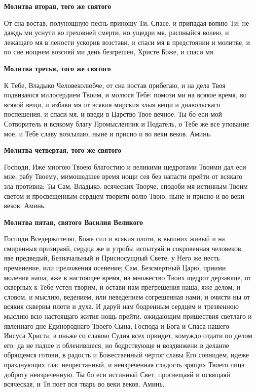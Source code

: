 \medskip
\bfseries  Молитва вторая, того же святого\normalfont{}


От сна востав, полунощную песнь приношу Ти, Спасе, и припадая вопию Ти: не даждь ми уснути во греховней смерти, но ущедри мя, распныйся волею, и лежащаго мя в лености ускорив возстави, и спаси мя в предстоянии и молитве, и по сне нощнем возсияй ми день безгрешен, Христе Боже, и спаси мя.


\medskip
\bfseries Молитва третья, того же святого\normalfont{}


К Тебе, Владыко Человеколюбче, от сна востав прибегаю, и на дела Твоя подвизаюся милосердием Твоим, и молюся Тебе: помози ми на всякое время, во всякой вещи, и избави мя от всякия мирския злыя вещи и диавольскаго поспешения, и спаси мя, и введи в Царство Твое вечное. Ты бо еси мой Сотворитель и всякому благу Промысленник и Податель, о Тебе же все упование мое, и Тебе славу возсылаю, ныне и присно и во веки веков. Аминь.


\medskip
\bfseries Молитва четвертая, того же святого\normalfont{}


Господи, Иже многою Твоею благостию и великими щедротами Твоими дал еси мне, рабу Твоему, мимошедшее время нощи сея без напасти прейти от всякаго зла противна; Ты Сам, Владыко, всяческих Творче, сподоби мя истинным Твоим светом и просвещенным сердцем творити волю Твою, ныне и присно и во веки веков. Аминь.




\medskip
\bfseries Молитва пятая, святого Василия Великого\normalfont{}


Господи Вседержителю, Боже сил и всякия плоти, в вышних живый и на смиренныя призираяй, сердца же и утробы испытуяй и сокровенная человеков яве предведый, Безначальный и Присносущный Свете, у Него же несть пременение, или преложения осенение; Сам, Безсмертный Царю, приими моления наша, яже в настоящее время, на множество Твоих щедрот дерзающе, от скверных к Тебе устен творим, и остави нам прегрешения наша, яже делом, и словом, и мыслию, ведением, или неведением согрешенная нами; и очисти ны от всякия скверны плоти и духа. И даруй нам бодренным сердцем и трезвенною мыслию всю настоящаго жития нощь прейти, ожидающим пришествия светлаго и явленнаго дне Единороднаго Твоего Сына, Господа и Бога и Спаса нашего Иисуса Христа, в оньже со славою Судия всех приидет, комуждо отдати по делом его; да не падше и обленившеся, но бодрствующе и воздвижени в делание обрящемся готови, в радость и Божественный чертог славы Его совнидем, идеже празднующих глас непрестанный, и неизреченная сладость зрящих Твоего лица доброту неизреченную. Ты бо еси истинный Свет, просвещаяй и освящаяй всяческая, и Тя поет вся тварь во веки веков. Аминь. 


